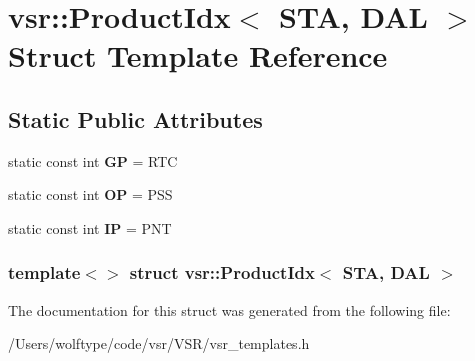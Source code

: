 \hypertarget{structvsr_1_1_product_idx_3_01_s_t_a_00_01_d_a_l_01_4}{\section{vsr\-:\-:Product\-Idx$<$ S\-T\-A, D\-A\-L $>$ Struct Template Reference}
\label{structvsr_1_1_product_idx_3_01_s_t_a_00_01_d_a_l_01_4}
}
\subsection*{Static Public Attributes}
\begin{DoxyCompactItemize}
\item 
\hypertarget{structvsr_1_1_product_idx_3_01_s_t_a_00_01_d_a_l_01_4_a73bdefbe13cc40325fbc24234fe27b3b}{static const int {\bfseries G\-P} = R\-T\-C}\label{structvsr_1_1_product_idx_3_01_s_t_a_00_01_d_a_l_01_4_a73bdefbe13cc40325fbc24234fe27b3b}

\item 
\hypertarget{structvsr_1_1_product_idx_3_01_s_t_a_00_01_d_a_l_01_4_a62ff73246dff4a9a010ddb03b67bfa16}{static const int {\bfseries O\-P} = P\-S\-S}\label{structvsr_1_1_product_idx_3_01_s_t_a_00_01_d_a_l_01_4_a62ff73246dff4a9a010ddb03b67bfa16}

\item 
\hypertarget{structvsr_1_1_product_idx_3_01_s_t_a_00_01_d_a_l_01_4_a5b4e5b4f25c4ca8d8b3d998ecfe3fe3b}{static const int {\bfseries I\-P} = P\-N\-T}\label{structvsr_1_1_product_idx_3_01_s_t_a_00_01_d_a_l_01_4_a5b4e5b4f25c4ca8d8b3d998ecfe3fe3b}

\end{DoxyCompactItemize}
\subsubsection*{template$<$$>$ struct vsr\-::\-Product\-Idx$<$ S\-T\-A, D\-A\-L $>$}



The documentation for this struct was generated from the following file\-:\begin{DoxyCompactItemize}
\item 
/\-Users/wolftype/code/vsr/\-V\-S\-R/vsr\-\_\-templates.\-h\end{DoxyCompactItemize}
